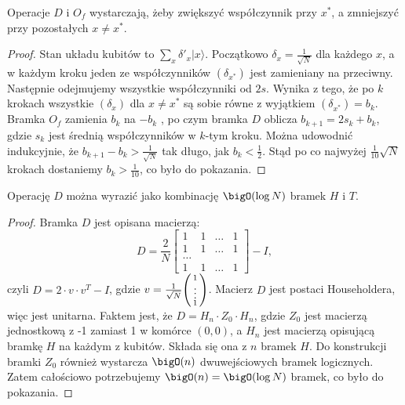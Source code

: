 \begin{lemma}
	Operacje \( D \) i \( O_f \) wystarczają, żeby zwiększyć współczynnik przy \( x^{*} \), a zmniejszyć przy pozostałych \( x \neq x^{*} \).
\end{lemma}
\begin{proof}
	Stan układu kubitów to \( \sum_{x} \delta'_x |x\rangle \). Początkowo \( \delta_x = \frac{1}{\sqrt{N}} \) dla każdego \( x \),
	a w każdym kroku jeden ze współczynników \( (\delta_{x^{*}}) \) jest zamieniany na przeciwny. Następnie odejmujemy wszystkie współczynniki od \( 2s \).
	Wynika z tego, że po \( k \) krokach wszystkie \( (\delta_x) \) dla \( x \neq x^{*} \) są sobie równe z wyjątkiem \( (\delta_{x^{*}}) = b_k \).
	Bramka \( O_f \) zamienia \( b_k \) na \( -b_k \) , po czym bramka \( D \) oblicza \( b_{k+1} = 2s_k + b_k \), gdzie \( s_k \) jest średnią współczynników w \( k \)-tym kroku.
	Można udowodnić indukcyjnie, że \( b_{k+1} - b_k > \frac{1}{\sqrt{N}} \) tak długo, jak \( b_k < \frac{1}{2} \).
	Stąd po co najwyżej \( \frac{1}{10} \sqrt{N} \) krokach dostaniemy \( b_k > \frac{1}{10} \), co było do pokazania.
\end{proof}
\begin{lemma}
	Operację \( D \) można wyrazić jako kombinację \( \bigO(\log N) \) bramek \( H \) i \( T \).
\end{lemma}
\begin{proof}
	Bramka \( D \) jest opisana macierzą:
	\[
		D = \frac{2}{N}
		\begin{bmatrix}
			1 & 1 & \ldots & 1 \\
			1 & 1 & \ldots & 1 \\
			\ldots             \\
			1 & 1 & \ldots & 1
		\end{bmatrix}
		- I,
	\]
	czyli \( D = 2 \cdot v \cdot v^T - I \), gdzie \( v = \frac{1}{\sqrt{N}}
	\pars{\begin{smallmatrix}
			1 \\
			\vdots \\
			1
		\end{smallmatrix}} \).
	Macierz \( D \) jest postaci Householdera, więc jest unitarna. Faktem jest, że \( D = H_n \cdot Z_0 \cdot H_n \), gdzie \( Z_0 \) jest macierzą jednostkową z -1 zamiast 1 w komórce \( (0,0) \),
	a \( H_n \) jest macierzą opisującą bramkę \( H \) na każdym z kubitów. Składa się ona z \( n \) bramek \( H \). Do konstrukcji bramki \( Z_0 \) również wystarcza \( \bigO(n) \) dwuwejściowych bramek logicznych.
	Zatem całościowo potrzebujemy \( \bigO(n) = \bigO(\log N) \) bramek, co było do pokazania.
\end{proof}
